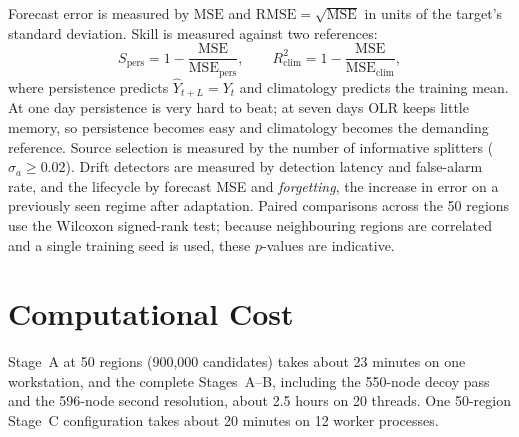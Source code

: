 Forecast error is measured by $\mathrm{MSE}$ and $\mathrm{RMSE}=\sqrt{\mathrm{MSE}}$ in units of the target's standard deviation. Skill is measured against two references:
\begin{equation}
  S_{\mathrm{pers}}=1-\frac{\mathrm{MSE}}{\mathrm{MSE}_{\mathrm{pers}}},\qquad
  R^2_{\mathrm{clim}}=1-\frac{\mathrm{MSE}}{\mathrm{MSE}_{\mathrm{clim}}},
  \label{eq:skill}
\end{equation}
where persistence predicts $\hat{Y}_{t+L}=Y_t$ and climatology predicts the training mean. At one day persistence is very hard to beat; at seven days OLR keeps little memory, so persistence becomes easy and climatology becomes the demanding reference. Source selection is measured by the number of informative splitters ($\sigma_a\ge0.02$). Drift detectors are measured by detection latency and false-alarm rate, and the lifecycle by forecast MSE and \emph{forgetting}, the increase in error on a previously seen regime after adaptation. Paired comparisons across the 50 regions use the Wilcoxon signed-rank test; because neighbouring regions are correlated and a single training seed is used, these $p$-values are indicative.

\section{Computational Cost}
\label{sec:exp-runtime}

Stage~A at 50 regions (900{,}000 candidates) takes about 23 minutes on one workstation, and the complete Stages~A--B, including the 550-node decoy pass and the 596-node second resolution, about 2.5 hours on 20 threads. One 50-region Stage~C configuration takes about 20 minutes on 12 worker processes.
